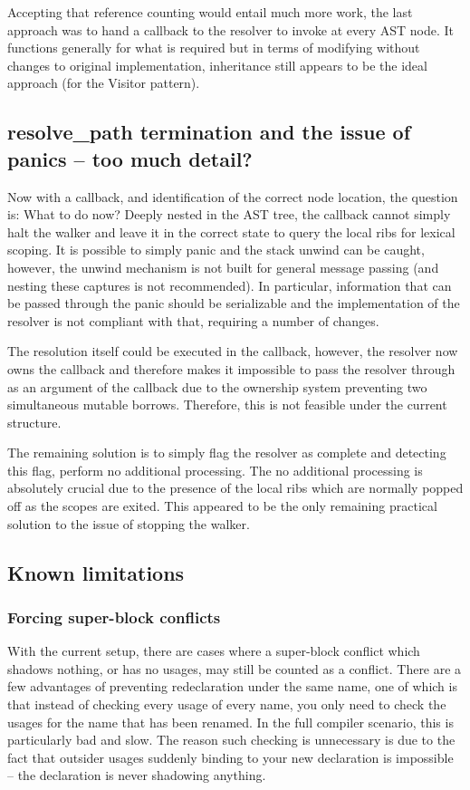 Accepting that reference counting would entail much more work, the last approach was to hand a callback to the resolver to invoke at every AST node. It functions generally for what is required but in terms of modifying without changes to original implementation, inheritance still appears to be the ideal approach (for the Visitor pattern).

\subsection{resolve\_path termination and the issue of panics -- too much detail?}
Now with a callback, and identification of the correct node location, the question is: What to do now? Deeply nested in the AST tree, the callback cannot simply halt the walker and leave it in the correct state to query the local ribs for lexical scoping. It is possible to simply panic and the stack unwind can be caught, however, the unwind mechanism is not built for general message passing (and nesting these captures is not recommended). In particular, information that can be passed through the panic should be serializable and the implementation of the resolver is not compliant with that, requiring a number of changes.

The resolution itself could be executed in the callback, however, the resolver now owns the callback and therefore makes it impossible to pass the resolver through as an argument of the callback due to the ownership system preventing two simultaneous mutable borrows. Therefore, this is not feasible under the current structure.

The remaining solution is to simply flag the resolver as complete and detecting this flag, perform no additional processing. The no additional processing is absolutely crucial due to the presence of the local ribs which are normally popped off as the scopes are exited. This appeared to be the only remaining practical solution to the issue of stopping the walker.

\subsection{Known limitations}\label{S:limit}
\subsubsection{Forcing super-block conflicts}
With the current setup, there are cases where a super-block conflict which shadows nothing, or has no usages, may still be counted as a conflict. There are a few advantages of preventing redeclaration under the same name, one of which is that instead of checking every usage of every name, you only need to check the usages for the name that has been renamed. In the full compiler scenario, this is particularly bad and slow. The reason such checking is unnecessary is due to the fact that outsider usages suddenly binding to your new declaration is impossible -- the declaration is never shadowing anything.

